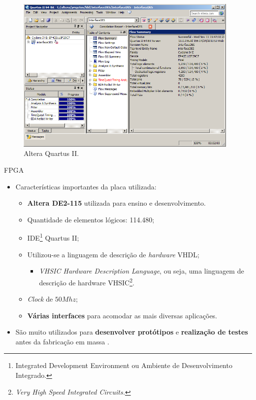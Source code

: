 	\begin{frame}
		\begin{figure}[p]
			\centering
			\includegraphics[width=0.97\textwidth]{img/fpga/altera.png}
			\caption{Altera Quartus II.}
			\label{fig:fpgaHardware}
		\end{figure}
	\end{frame}
	\begin{frame}{FPGA}
		\begin{itemize}
			\item Características importantes da placa utilizada:
			\begin{itemize}
  				\setlength\itemsep{1em}
				\item \textbf{Altera DE2-115} utilizada para ensino e desenvolvimento.
				\item Quantidade de elementos lógicos: 114.480;
				\item IDE\footnote{Integrated Development Environment ou Ambiente de Desenvolvimento Integrado.} Quartus II;
				\item Utilizou-se a linguagem de descrição de \textit{hardware} VHDL;
				\begin{itemize}
					\item \textit{VHSIC Hardware Description Language}, ou seja, uma linguagem de descrição de hardware VHSIC\footnote{\textit{Very High Speed Integrated Circuits.}}.
				\end{itemize}
				\item \textit{Clock} de $50Mhz$;
				\item \textbf{Várias interfaces} para acomodar as mais diversas aplicações.
			\end{itemize} 
			\bigskip
			\item São muito utilizados para \textbf{desenvolver protótipos} e \textbf{realização de testes} antes da fabricação em massa \cite{skliarova2003introduccao}.
		\end{itemize}
	\end{frame}

